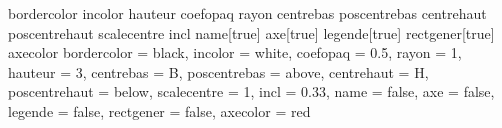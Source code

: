  {bordercolor}{}
 {incolor}{}
 {hauteur}{}
 {coefopaq}{}
 {rayon}{}
 {centrebas}{}
 {poscentrebas}{}
 {centrehaut}{}
 {poscentrehaut}{}
 {scalecentre}{}
 {incl}{}
 {name}[true]{}
 {axe}[true]{}
 {legende}[true]{}
 {rectgener}[true]{}
 {axecolor}{}
 {bordercolor = black,
 							 incolor = white,
 							 coefopaq = 0.5,
 							 rayon = 1,
 							 hauteur = 3,
 							 centrebas = B,
 							 poscentrebas = above,
 							 centrehaut = H,
 							 poscentrehaut = below,
 							 scalecentre = 1,
 							 incl = 0.33,
 							 name = false,
 							 axe = false,
 							 legende = false,
							 rectgener = false,
 							 axecolor = red}{}

\newcommand*{\cylindre}[1][]{\pasCylindre[#1]}

